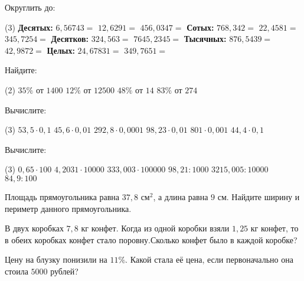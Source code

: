 \begin{class}[number=7]
	\begin{listofex}
		\item Округлить до:
		\begin{tasks}(3)
			\task[] \textbf{Десятых:}
			\task[]
			\task[]
			\task \( 6,56743 = \)
			\task \( 12, 6291 = \)
			\task \( 456,0347 = \)
			\task[] \textbf{Сотых:}
			\task[]
			\task[]
			\task \( 768,342 = \)
			\task \( 22,4581 = \)
			\task \( 345,7254 = \)
			\task[] \textbf{Десятков:}
			\task[]
			\task[]
			\task \( 324,563 = \)
			\task \( 7645,2345 = \)
			\task[]
			\task[] \textbf{Тысячных:}
			\task[]
			\task[]
			\task \( 876,5439 = \)
			\task \( 42,9872 = \)
			\task[]
			\task[] \textbf{Целых:}
			\task[]
			\task[]
			\task \( 24,67831 = \)
			\task \( 349,7651 = \)
		\end{tasks}
		\item Найдите:
		\begin{tasks}(2)
			\task \( 35\% \) от \( 1400 \)
			\task \( 12\% \) от \( 12500 \)
			\task \( 48\% \) от \( 14 \)
			\task \( 83\% \) от \( 274 \)
		\end{tasks}
		\item Вычислите:
		\begin{tasks}(3)
			\task \( 53,5\cdot0,1 \)
			\task \( 45,6\cdot0,01 \)
			\task \( 292,8\cdot0,0001 \)
			\task \( 98,23\cdot0,01 \)
			\task \( 801\cdot0,001 \)
			\task \( 44,4\cdot0,1 \)
		\end{tasks}
		\item Вычислите: \begin{tasks}(3)
			\task \( 0,65\cdot100 \)
			\task \( 4,2031\cdot10000 \)
			\task \( 333,003\cdot100000 \)
			\task \( 98,21:1000 \)
			\task \( 3215,005:10000 \)
			\task \( 84,9:100 \)
		\end{tasks}
		\item Площадь прямоугольника равна \( 37,8 \) см\( ^{2} \), а длина равна \( 9 \) см. Найдите ширину и периметр данного прямоугольника.
		\item В двух коробках \( 7,8 \) кг конфет. Когда из одной коробки взяли \( 1,25 \) кг конфет, то в обеих коробках конфет стало поровну.Сколько конфет было в каждой коробке?
		\item Цену на блузку понизили на \( 11\% \). Какой стала её цена, если первоначально она стоила \( 5000 \) рублей?
	\end{listofex}
\end{class}

